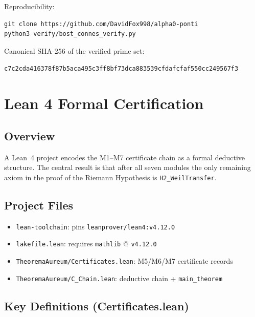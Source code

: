 \documentclass[11pt,letterpaper]{article}
\theoremstyle{definition}
\begin{document}
Reproducibility:
\begin{lstlisting}
git clone https://github.com/DavidFox998/alpha0-ponti
python3 verify/bost_connes_verify.py
\end{lstlisting}

Canonical SHA-256 of the verified prime set:
\begin{center}
\texttt{c7c2cda416378f87b5aca495c3ff8bf73dca883539cfdafcfaf550cc249567f3}
\end{center}

\section{Lean 4 Formal Certification}\label{sec:lean}

\subsection*{Overview}

A Lean~4 project encodes the M1--M7 certificate chain as a formal deductive
structure.  The central result is that after all seven modules the only remaining
axiom in the proof of the Riemann Hypothesis is \texttt{H2\_WeilTransfer}.

\subsection*{Project Files}

\begin{itemize}
\item \texttt{lean-toolchain}: pins \texttt{leanprover/lean4:v4.12.0}
\item \texttt{lakefile.lean}: requires \texttt{mathlib} @ \texttt{v4.12.0}
\item \texttt{TheoremaAureum/Certificates.lean}: M5/M6/M7 certificate records
\item \texttt{TheoremaAureum/C\_Chain.lean}: deductive chain + \texttt{main\_theorem}
\end{itemize}

\subsection*{Key Definitions (Certificates.lean)}
\end{document}
